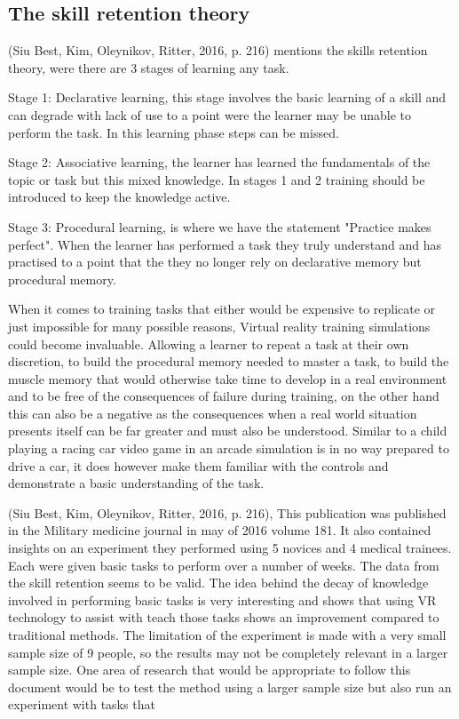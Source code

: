 \documentclass[10pt,journal,compsoc]{IEEEtran}
\begin{document}
	\subsection{The skill retention theory}
	(Siu Best, Kim, Oleynikov, Ritter, 2016, p. 216) mentions the skills retention theory, were there are 3 stages of learning any task. \newline
	
	Stage  1: Declarative learning, this stage involves the basic learning of a skill and can degrade with lack of use to a point were the learner may be unable to perform the task. In this learning phase steps can be missed. \newline 
	
	Stage 2: Associative  learning, the learner has learned the fundamentals of the topic or task but this mixed knowledge. In stages 1 and 2 training should be introduced to keep the knowledge active.\newline
	
	Stage 3: Procedural learning, is where we have the statement "Practice makes perfect". When the learner has performed a task they truly understand and has practised to a point that the they no longer rely on declarative memory but procedural memory. \newline
	
	When it comes to training tasks that either would be expensive to replicate or just impossible for many possible reasons, Virtual reality training simulations could become invaluable. Allowing a learner to repeat a task at their own discretion, to build the procedural memory needed to master a task, to build the muscle memory that would otherwise take time to develop in a real environment and to be free of the consequences of failure during training, on the other hand this can also be a negative as the consequences when a real world situation presents itself can be far greater and must also be understood. Similar to a child playing a racing car video game in an arcade simulation is in no way prepared to drive a car, it does however make them familiar with the controls and demonstrate a basic understanding of the task. \newline
	
	(Siu Best, Kim, Oleynikov, Ritter, 2016, p. 216), This publication was published in the Military medicine journal in may of 2016 volume 181. It also contained insights on an experiment they performed using 5 novices and 4 medical trainees. Each were given basic tasks to perform over a number of weeks. The data from the skill retention seems to be valid. The idea behind the decay of knowledge involved in performing basic tasks is very interesting and shows that using VR technology to assist with teach those tasks shows an improvement compared to traditional methods. The limitation of the experiment is made with a very small sample size of 9 people, so the results may not be completely relevant in a larger sample size. One area of research that would be appropriate to follow this document would be to test the method using a larger sample size but also run an experiment with tasks that 
	
\end{document}
